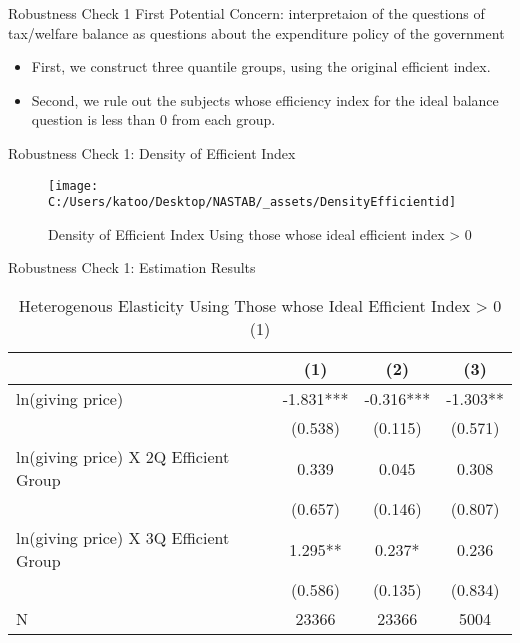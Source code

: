 \documentclass[
  ignorenonframetext,
]{beamer}
\providecommand{\tightlist}{%
  \setlength{\itemsep}{0pt}\setlength{\parskip}{0pt}}
\begin{document}
\begin{frame}{Robustness Check 1}
\protect\hypertarget{robustness-check-1-1}{}
First Potential Concern: interpretaion of the questions of tax/welfare balance as questions about the expenditure policy of the government

\begin{itemize}
\tightlist
\item
  First, we construct three quantile groups, using the original efficient index.
\item
  Second, we rule out the subjects whose efficiency index for the ideal balance question is less than 0 from each group.
\end{itemize}
\end{frame}

\begin{frame}{Robustness Check 1: Density of Efficient Index}
\protect\hypertarget{robustness-check-1-density-of-efficient-index}{}
\begin{figure}

{\centering \texttt{[image: C:/Users/katoo/Desktop/NASTAB/\_assets/DensityEfficientid]} 

}

\caption{Density of Efficient Index Using those whose ideal efficient index > 0}\label{fig:unnamed-chunk-2}
\end{figure}
\end{frame}

\begin{frame}{Robustness Check 1: Estimation Results}
\protect\hypertarget{robustness-check-1-estimation-results}{}
\begin{table}

\caption{\label{tab:kableSubsetHeteroElasticitySlide1}Heterogenous Elasticity Using Those whose Ideal Efficient Index > 0 (1)}
\centering
\fontsize{8}{10}\selectfont
\begin{tabular}[t]{lccc}
\toprule
 & (1) & (2) & (3)\\
\midrule
ln(giving price) & -1.831*** & -0.316*** & -1.303**\\
 & (0.538) & (0.115) & (0.571)\\
ln(giving price) X 2Q Efficient Group & 0.339 & 0.045 & 0.308\\
 & (0.657) & (0.146) & (0.807)\\
ln(giving price) X 3Q Efficient Group & 1.295** & 0.237* & 0.236\\
 & (0.586) & (0.135) & (0.834)\\
N & 23366 & 23366 & 5004\\
\bottomrule
\end{tabular}
\end{table}
\end{frame}
\end{document}

